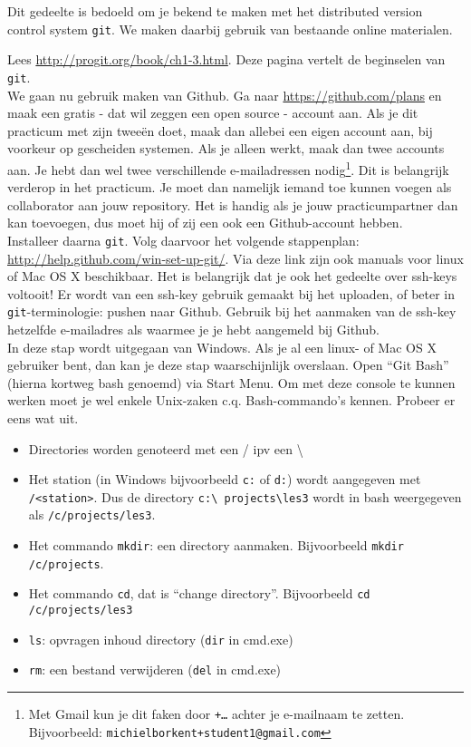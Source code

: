 Dit gedeelte is bedoeld om je bekend te maken met het distributed
version control system {\tt git}. We maken daarbij gebruik van
bestaande online materialen. \\

\stepreset
  
\step Lees \url{http://progit.org/book/ch1-3.html}. Deze pagina vertelt
de beginselen van {\tt git}. \\

\step We gaan nu gebruik maken van Github. Ga naar \url{https://github.com/plans} en maak een gratis - dat
wil zeggen een open source - account aan. Als je dit practicum met zijn
tweeën doet, maak dan allebei een eigen account aan, bij voorkeur op
gescheiden systemen. Als je alleen werkt, maak dan twee accounts aan.
Je hebt dan wel twee verschillende e-mailadressen nodig\footnote{Met
  Gmail kun je dit faken door {\tt +\ldots} achter je e-mailnaam te zetten.
  Bijvoorbeeld: {\tt michielborkent+student1@gmail.com}}. Dit is belangrijk verderop in
het practicum. Je moet dan namelijk iemand toe kunnen voegen als
collaborator aan jouw repository. Het is handig als je jouw
practicumpartner dan kan toevoegen, dus moet hij of zij een
ook een Github-account hebben.\\

\step Installeer daarna {\tt git}. Volg daarvoor het volgende stappenplan:
\url{http://help.github.com/win-set-up-git/}. Via deze link zijn ook
manuals voor linux of Mac OS X beschikbaar. Het is belangrijk dat je
ook het gedeelte over ssh-keys voltooit! Er wordt van een ssh-key
gebruik gemaakt bij het uploaden, of beter in {\tt git}-terminologie:
pushen naar Github. Gebruik bij het aanmaken van
de ssh-key hetzelfde e-mailadres als waarmee je je hebt aangemeld bij
Github. \\

\step In deze stap wordt uitgegaan van Windows. Als je al een linux-
of Mac OS X gebruiker bent, dan kan je deze stap waarschijnlijk
overslaan. Open ``Git Bash'' (hierna kortweg bash genoemd) via Start Menu. Om met deze console te kunnen
werken moet je wel enkele Unix-zaken c.q. Bash-commando's kennen.
Probeer er eens wat uit.

\begin{itemize}
\item Directories worden genoteerd met een / ipv een \textbackslash 
\item  Het station (in Windows bijvoorbeeld {\tt c:} of {\tt d:})
  wordt aangegeven met {\tt /<station>}. Dus de directory {\tt c:\textbackslash
    projects\textbackslash les3} wordt in bash
  weergegeven als {\tt /c/projects/les3}.
\item Het commando {\tt mkdir}: een directory aanmaken. Bijvoorbeeld
  {\tt mkdir /c/projects}.
\item Het commando {\tt cd}, dat is ``change directory''. Bijvoorbeeld  {\tt cd /c/projects/les3}
\item {\tt ls}: opvragen inhoud directory ({\tt dir} in cmd.exe)
\item {\tt rm}: een bestand verwijderen ({\tt del} in cmd.exe)
\end{itemize}

